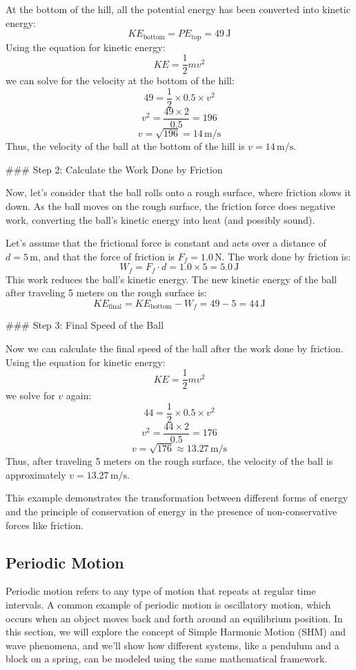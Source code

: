 \documentclass{article}
\begin{document}
At the bottom of the hill, all the potential energy has been converted into kinetic energy:
\[
KE_{\text{bottom}} = PE_{\text{top}} = 49 \, \text{J}
\]
Using the equation for kinetic energy:
\[
KE = \frac{1}{2} m v^2
\]
we can solve for the velocity at the bottom of the hill:
\[
49 = \frac{1}{2} \times 0.5 \times v^2
\]
\[
v^2 = \frac{49 \times 2}{0.5} = 196
\]
\[
v = \sqrt{196} = 14 \, \text{m/s}
\]
Thus, the velocity of the ball at the bottom of the hill is \( v = 14 \, \text{m/s} \).

### Step 2: Calculate the Work Done by Friction

Now, let's consider that the ball rolls onto a rough surface, where friction slows it down. As the ball moves on the rough surface, the friction force does negative work, converting the ball's kinetic energy into heat (and possibly sound).

Let's assume that the frictional force is constant and acts over a distance of \( d = 5 \, \text{m} \), and that the force of friction is \( F_f = 1.0 \, \text{N} \). The work done by friction is:
\[
W_f = F_f \cdot d = 1.0 \times 5 = 5.0 \, \text{J}
\]
This work reduces the ball's kinetic energy. The new kinetic energy of the ball after traveling 5 meters on the rough surface is:
\[
KE_{\text{final}} = KE_{\text{bottom}} - W_f = 49 - 5 = 44 \, \text{J}
\]

### Step 3: Final Speed of the Ball

Now we can calculate the final speed of the ball after the work done by friction. Using the equation for kinetic energy:
\[
KE = \frac{1}{2} m v^2
\]
we solve for \( v \) again:
\[
44 = \frac{1}{2} \times 0.5 \times v^2
\]
\[
v^2 = \frac{44 \times 2}{0.5} = 176
\]
\[
v = \sqrt{176} \approx 13.27 \, \text{m/s}
\]
Thus, after traveling 5 meters on the rough surface, the velocity of the ball is approximately \( v = 13.27 \, \text{m/s} \).

This example demonstrates the transformation between different forms of energy and the principle of conservation of energy in the presence of non-conservative forces like friction.

\subsection{Periodic Motion}

Periodic motion refers to any type of motion that repeats at regular time intervals. A common example of periodic motion is oscillatory motion, which occurs when an object moves back and forth around an equilibrium position. In this section, we will explore the concept of Simple Harmonic Motion (SHM) and wave phenomena, and we'll show how different systems, like a pendulum and a block on a spring, can be modeled using the same mathematical framework.
\end{document}
